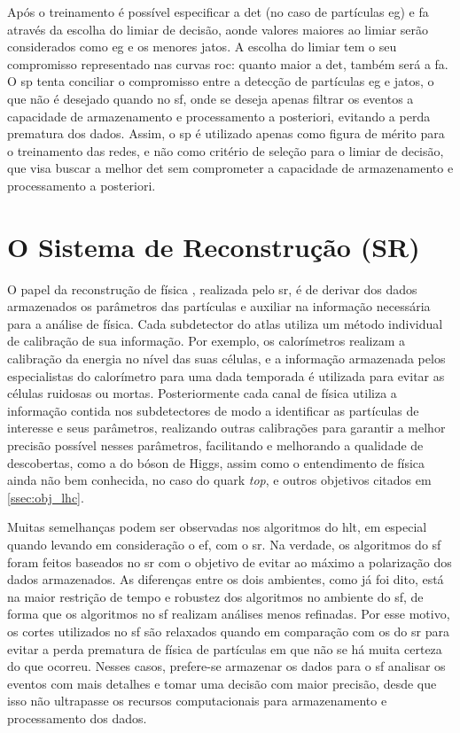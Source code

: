 Após o treinamento é possível especificar a \gls{det} (no caso de partículas \gls{eg}) 
e \gls{fa} através da escolha do limiar de decisão, aonde valores maiores ao limiar serão considerados
como \gls{eg} e os menores jatos. A escolha do limiar tem o seu compromisso
representado nas curvas \gls{roc}: quanto maior a \gls{det}, também será a
\gls{fa}. O \gls{sp} tenta conciliar o compromisso entre a detecção de
partículas \gls{eg} e jatos, o que não é desejado quando no \gls{sf}, onde se
deseja apenas filtrar os eventos a capacidade de armazenamento e processamento a
posteriori, evitando a perda prematura dos dados. Assim, o \gls{sp} é utilizado
apenas como figura de mérito para o treinamento das redes, e não como critério
de seleção para o limiar de decisão, que visa buscar a melhor \gls{det} sem
comprometer a capacidade de armazenamento e processamento a posteriori.

\section{O Sistema de Reconstrução (SR)}
\label{sec:sr}

O papel da reconstrução de física \cite{physics_perf_expected,atlas_computing_tdr}, 
realizada pelo \gls{sr}, é de derivar dos dados armazenados os parâmetros das partículas 
e auxiliar na informação necessária para a análise de física. 
Cada subdetector do \gls{atlas} utiliza um método individual de calibração de
sua informação. Por exemplo, os calorímetros realizam a calibração da energia no
nível das suas células, e a informação armazenada pelos especialistas do
calorímetro para uma dada temporada é utilizada para evitar as células ruidosas ou mortas. 
Posteriormente cada canal de física utiliza a informação contida nos
subdetectores de modo a identificar as partículas de interesse e seus
parâmetros, realizando outras calibrações para garantir a melhor precisão
possível nesses parâmetros, facilitando e melhorando a qualidade de
descobertas, como a do bóson de Higgs, assim como o entendimento de física ainda não bem
conhecida, no caso do quark \emph{top}, e outros objetivos citados em
\ref{ssec:obj_lhc}.

Muitas semelhanças podem ser observadas nos algoritmos do \gls{hlt}, em especial
quando levando em consideração o \gls{ef}, com o \gls{sr}. Na verdade, os algoritmos do \gls{sf} foram feitos
baseados no \gls{sr} com o objetivo de evitar ao máximo a polarização dos dados
armazenados. As diferenças entre os dois ambientes, como já foi dito, está na
maior restrição de tempo e robustez dos algoritmos no ambiente do \gls{sf}, de
forma que os algoritmos no \gls{sf} realizam análises menos refinadas. Por esse
motivo, os cortes utilizados no \gls{sf} são relaxados quando em comparação com
os do \gls{sr} para evitar a perda prematura de física de partículas em que não
se há muita certeza do que ocorreu. Nesses casos, prefere-se armazenar os
dados para o \gls{sf} analisar os eventos com mais detalhes e tomar uma decisão
com maior precisão, desde que isso não ultrapasse os recursos computacionais para 
armazenamento e processamento dos dados.


